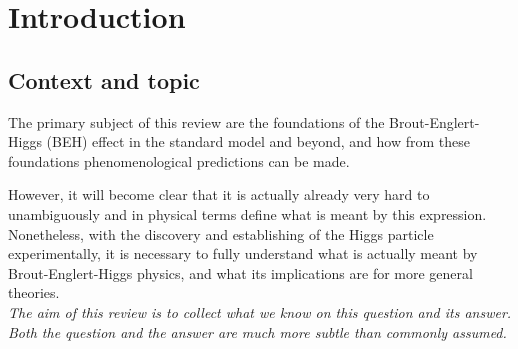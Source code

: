 \documentclass[final,12pt]{article}
\newcommand*{\1}{1\!\!\!\bot}
\begin{document}

\setcounter{secnumdepth}{4}
\setcounter{tocdepth}{4}
\tableofcontents
\newpage
{}

\section{Introduction}\label{sintro}

\subsection{Context and topic}

The primary subject of this review are the foundations of the Brout-Englert-Higgs (BEH) effect \cite{Englert:1964et,Higgs:1964pj,Higgs:1964ia,Higgs:1966ev,Guralnik:1964eu,Kibble:1967sv,Englert:1966uea} in the standard model and beyond, and how from these foundations phenomenological predictions can be made.

However, it will become clear that it is actually already very hard to unambiguously and in physical terms define what is meant by this expression. Nonetheless, with the discovery \cite{Aad:2012tfa,Chatrchyan:2012ufa} and establishing \cite{pdg,Khachatryan:2016vau} of the Higgs particle experimentally, it is necessary to fully understand what is actually meant by Brout-Englert-Higgs physics, and what its implications are for more general theories.\\[0.5mm]

{\em The aim of this review is to collect what we know on this question and its answer. Both the question and the answer are much more subtle than commonly assumed.}\\[0.5mm]
\end{document}
